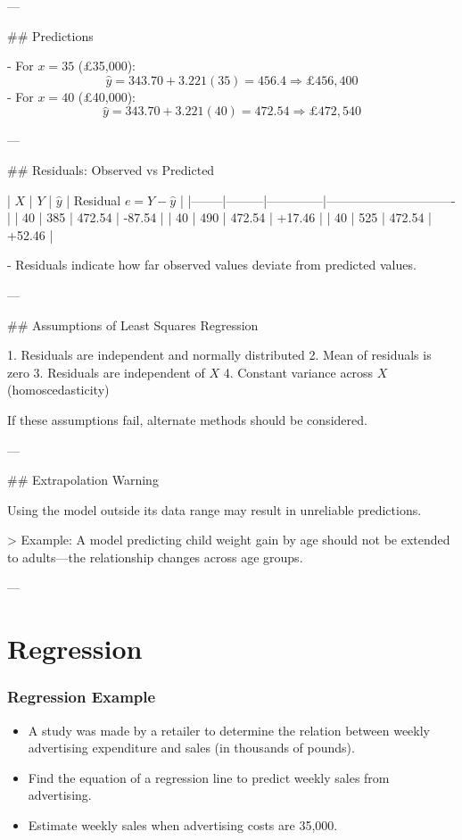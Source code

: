 ---

## Predictions

- For \( x = 35 \) (£35,000):
  \[
  \hat{y} = 343.70 + 3.221(35) = 456.4 ⇒ £456,400
  \]
- For \( x = 40 \) (£40,000):
  \[
  \hat{y} = 343.70 + 3.221(40) = 472.54 ⇒ £472,540
  \]

---

## Residuals: Observed vs Predicted

| \( X \) | \( Y \) | \( \hat{y} \) | Residual \( e = Y - \hat{y} \) |
|--------|---------|--------------|-------------------------------|
| 40     | 385     | 472.54       | -87.54                        |
| 40     | 490     | 472.54       | +17.46                        |
| 40     | 525     | 472.54       | +52.46                        |

- Residuals indicate how far observed values deviate from predicted values.

---

## Assumptions of Least Squares Regression

1. Residuals are independent and normally distributed  
2. Mean of residuals is zero  
3. Residuals are independent of \( X \)  
4. Constant variance across \( X \) (homoscedasticity)

If these assumptions fail, alternate methods should be considered.

---

## Extrapolation Warning

Using the model outside its data range may result in unreliable predictions.

> Example: A model predicting child weight gain by age should not be extended to adults—the relationship changes across age groups.

---

	\chapter{Regression}
	
	
	\subsection{Regression Example}
	\begin{itemize}
		\item A study was made by a retailer to determine the relation between weekly advertising
		expenditure and sales (in thousands of pounds).
		\item Find the equation of a regression line
		to predict weekly sales from advertising.
		\item Estimate weekly sales when advertising
		costs are 35,000.
	\end{itemize}
	
